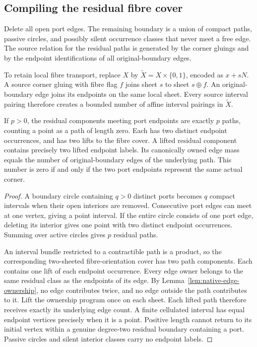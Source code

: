 \subsection{Compiling the residual fibre cover}

Delete all open port edges.  The remaining boundary is a union of compact
paths, passive circles, and possibly silent occurrence classes that never
meet a free edge.  The source relation for the residual paths is generated
by the corner gluings and by the endpoint identifications of all
original-boundary edges.

To retain local fibre transport, replace $X$ by
$\widetilde X=X\times\{0,1\}$, encoded as $x+sN$.  A source corner gluing
with fibre flag $f$ joins sheet $s$ to sheet $s\mathbin{\oplus}f$.
An original-boundary edge joins its endpoints on the same local sheet.
Every source interval pairing therefore creates a bounded number of
affine interval pairings in $\widetilde X$.

\begin{lemma}
\label{lem:native-residual-degree}
If $p>0$, the residual components meeting port endpoints are exactly $p$
paths, counting a point as a path of length zero.  Each has two distinct
endpoint occurrences, and has two lifts to the fibre cover.  A lifted
residual component contains precisely two lifted endpoint labels.
Its canonically owned edge mass equals the number of original-boundary
edges of the underlying path.  This number is zero if and only if the two
port endpoints represent the same actual corner.
\end{lemma}

\begin{proof}
A boundary circle containing $q>0$ distinct ports becomes $q$ compact
intervals when their open interiors are removed.  Consecutive port edges
can meet at one vertex, giving a point interval.  If the entire circle
consists of one port edge, deleting its interior gives one point with two
distinct endpoint occurrences.  Summing over active circles gives $p$
residual paths.

An interval bundle restricted to a contractible path is a product, so the
corresponding two-sheeted fibre-orientation cover has two path components.
Each contains one lift of each endpoint occurrence.  Every edge owner
belongs to the same residual class as the endpoints of its edge.  By
Lemma~\ref{lem:native-edge-ownership}, no edge contributes twice, and no
edge outside the path contributes to it.  Lift the ownership program once
on each sheet.  Each lifted path therefore receives exactly its underlying
edge count.  A finite cellulated interval has equal endpoint vertices
precisely when it is a point.  Positive length cannot return to its initial
vertex within a genuine degree-two residual boundary containing a port.
Passive circles and silent interior classes carry no endpoint labels.
\end{proof}

